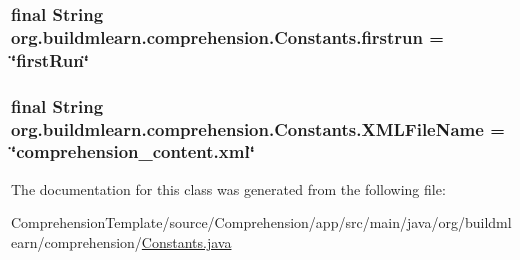 \subsubsection[{\texorpdfstring{firstrun}{firstrun}}]{\setlength{\rightskip}{0pt plus 5cm}final String org.\+buildmlearn.\+comprehension.\+Constants.\+firstrun = \char`\"{}first\+Run\char`\"{}\hspace{0.3cm}{\ttfamily [static]}}\hypertarget{classorg_1_1buildmlearn_1_1comprehension_1_1Constants_a61c1e6d5be66a5ffcd1032edfa055c5f}{}\label{classorg_1_1buildmlearn_1_1comprehension_1_1Constants_a61c1e6d5be66a5ffcd1032edfa055c5f}
\subsubsection[{\texorpdfstring{X\+M\+L\+File\+Name}{XMLFileName}}]{\setlength{\rightskip}{0pt plus 5cm}final String org.\+buildmlearn.\+comprehension.\+Constants.\+X\+M\+L\+File\+Name = \char`\"{}comprehension\+\_\+content.\+xml\char`\"{}\hspace{0.3cm}{\ttfamily [static]}}\hypertarget{classorg_1_1buildmlearn_1_1comprehension_1_1Constants_a37c033f17439d68472ded50cf2bf94d5}{}\label{classorg_1_1buildmlearn_1_1comprehension_1_1Constants_a37c033f17439d68472ded50cf2bf94d5}


The documentation for this class was generated from the following file\+:\begin{DoxyCompactItemize}
\item 
Comprehension\+Template/source/\+Comprehension/app/src/main/java/org/buildmlearn/comprehension/\hyperlink{ComprehensionTemplate_2source_2Comprehension_2app_2src_2main_2java_2org_2buildmlearn_2comprehension_2Constants_8java}{Constants.\+java}\end{DoxyCompactItemize}
